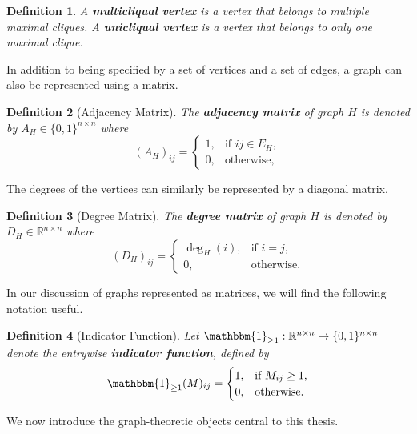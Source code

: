 \documentclass[11pt]{report}
\newtheorem{definition}{Definition}[section]
\begin{document}
\begin{definition} \label{def::multicliqual_vertex}
  A \textbf{multicliqual vertex} is a vertex that belongs to multiple maximal cliques. A \textbf{unicliqual vertex} is a vertex that belongs to only one maximal clique.    
\end{definition}

In addition to being specified by a set of vertices and a set of edges, a graph can also be represented using a matrix.

\begin{definition}[Adjacency Matrix] \label{def::adjacency_matrix}
  The \textbf{adjacency matrix} of graph $H$ is denoted by $A_H \in \{0,1\}^{n \times n}$ where
  \[
  (A_H)_{ij} =
  \begin{cases}
  1 ,& \text{if } ij \in E_H, \\
  0 ,& \text{otherwise},
  \end{cases}
  \]
\end{definition}

The degrees of the vertices can similarly be represented by a diagonal matrix.

\begin{definition}[Degree Matrix] \label{def::degree_matrix}
  The \textbf{degree matrix} of graph $H$ is denoted by $D_H \in \mathbb{R}^{n \times n}$ where
  \[
  (D_H)_{ij} =
  \begin{cases}
  \deg_H(i) ,& \text{if } i = j, \\
  0 ,& \text{otherwise}.
  \end{cases}
  \]
\end{definition}

In our discussion of graphs represented as matrices, we will find the following notation useful. 

\begin{definition}[Indicator Function] \label{def::indicator_function}
  Let $\mathbbm{1}_{\geq 1} : \mathbb{R}^{n \times n} \to \{0,1\}^{n \times n}$ denote the entrywise \textbf{indicator function}, defined by
  \[
  \mathbbm{1}_{\geq 1}(M)_{ij} =
  \begin{cases}
  1 ,& \text{if } M_{ij} \geq 1, \\
  0 ,& \text{otherwise}.
  \end{cases}
  \]
\end{definition}

We now introduce the graph-theoretic objects central to this thesis.
\end{document}
